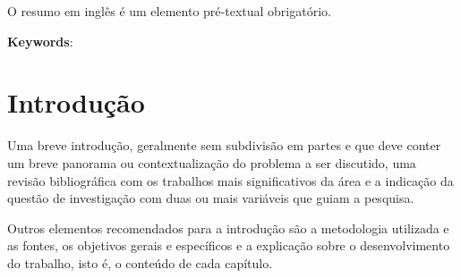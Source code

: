 \documentclass[rec]{fearp}
\begin{document}
\begin{resumo}[Abstract]
\vspace{\onelineskip}

O resumo em inglês é um elemento pré-textual obrigatório. 

\vspace*{\onelineskip}
\noindent
\textbf{Keywords}: \\
\jel{} 
\end{resumo}





\phantom{x}
\tableofcontents*
\cleardoublepage

\mainmatter 
\pagestyle{meuestilo}

 
\chapter*{Introdução}

Uma breve introdução, geralmente sem subdivisão em partes e que deve conter um breve panorama ou contextualização do problema a ser discutido, uma revisão bibliográfica com os trabalhos mais significativos da área e a indicação da questão de investigação com duas ou mais variáveis que guiam a pesquisa. 

Outros elementos recomendados para a introdução são a metodologia utilizada e as fontes, os objetivos gerais e específicos e a explicação sobre o desenvolvimento do trabalho, isto é, o conteúdo de cada capítulo.
\end{document}
